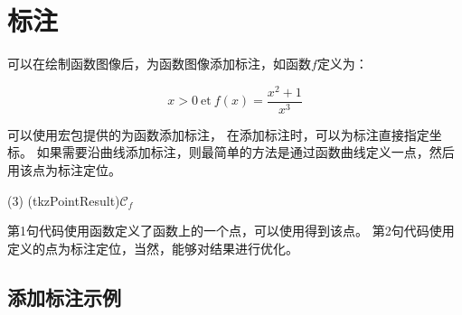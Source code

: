 \documentclass[../main.tex]{subfiles}
\begin{document}
\section{标注}

可以在绘制函数图像后，为函数图像添加标注，如函数$f$定义为：

\[
   x>0\ \text{et}\ f(x)=\dfrac{x^2+1}{x^3}
\]

可以使用宏包提供的为函数添加标注，
在添加标注时，可以为标注直接指定坐标。
如果需要沿曲线添加标注，则最简单的方法是通过函数曲线定义一点，然后用该点为标注定位。

\begin{tkzltxexample}[num]
  \tkzDefPointByFct(3)
  (tkzPointResult){${\mathcal{C}}_f$}
\end{tkzltxexample}

第1句代码使用函数定义了函数上的一个点，可以使用得到该点。
第2句代码使用定义的点为标注定位，当然，\TIKZ{}能够对结果进行优化。

\subsection{添加标注示例}

\begin{center}
\begin{tkzexample}[vbox]
\end{tkzexample}
\end{center}

\end{document}
